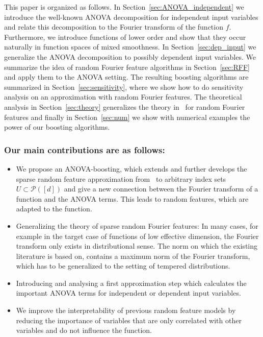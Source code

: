 \documentclass{article}
\theoremstyle{definition}
\numberwithin{equation}{section}
\begin{document}
This paper is organized as follows. In Section~\ref{sec:ANOVA_independent} we introduce the well-known ANOVA decomposition for independent input variables and relate this decomposition to the Fourier transform of the function $f$. Furthermore, we introduce functions of lower order and show that they occur naturally in function spaces of mixed smoothness. In Section~\ref{sec:dep_input} we generalize the ANOVA decomposition to possibly dependent input variables. We summarize the idea of random Fourier feature algorithms in Section~\ref{sec:RFF} and apply them to the ANOVA setting. The resulting boosting algorithms are summarized in Section~\ref{sec:sensitivity}, where we show how to do sensitivity analysis on an approximation with random Fourier features. The theoretical analysis in Section~\ref{sec:theory} generalizes the theory in~\cite{Ha23,Xie22} for random Fourier features and finally in Section~\ref{sec:num} we show with numerical examples the power of our boosting algorithms. 
 
\subsubsection*{Our main contributions are as follows:}
\begin{itemize}
	\item We propose an ANOVA-boosting, which extends and further develops the sparse random feature approximation from~\cite{Ha23,Xie22, HARFE23} to arbitrary index sets $U\subset \mathcal P([d])$ and give a new connection between the Fourier transform of a function and the ANOVA terms. This leads to random features, which are adapted to the function. 
	\item Generalizing the theory of sparse random Fourier features: In many cases, for example in the target case of functions of low effective dimension, the Fourier transform only exists in distributional sense. The norm on which the existing literature is based on, contains a maximum norm of the Fourier transform, which has to be generalized to the setting of tempered distributions.
	\item Introducing and analysing a first approximation step which calculates the important ANOVA terms for independent or dependent input variables.
	\item We improve the interpretability of previous random feature models by reducing the importance of variables that are only correlated with other variables and do not influence the function.
\end{itemize}
\end{document}
